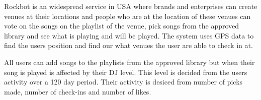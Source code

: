 Rockbot is an widespread service in USA where brands and enterprises can create venues at their locations and people who are at the location of these venues can vote on the songs on the playlist of the venue, pick songs from the approved library and see what is playing and will be played. The system uses GPS data to find the users position and find our what venues the user are able to check in at.\cite{rockbotFeatures}

All users can add songs to the playlists from the approved library but when their song is played is affected by their DJ level. This level is decided from the users activity over a 120 day period. Their activity is desiced from number of picks made, number of check-ins and number of likes.\cite{rockbotBlog}
